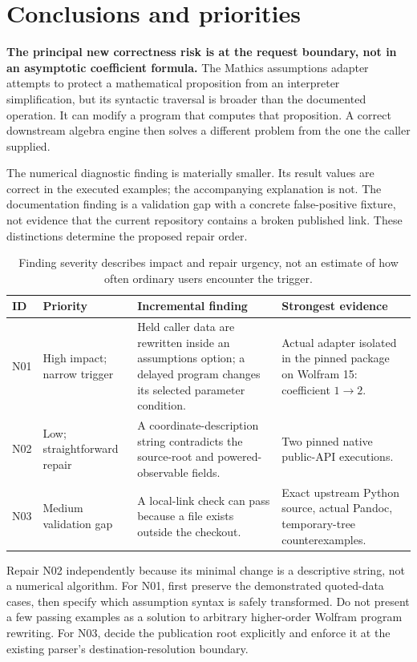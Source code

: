 \documentclass[11pt,letterpaper]{article}
\begin{document}
\section{Conclusions and priorities}

\textbf{The principal new correctness risk is at the request boundary, not in
an asymptotic coefficient formula.} The Mathics assumptions adapter attempts to
protect a mathematical proposition from an interpreter simplification, but its
syntactic traversal is broader than the documented operation. It can modify a
program that computes that proposition. A correct downstream algebra engine
then solves a different problem from the one the caller supplied.

The numerical diagnostic finding is materially smaller. Its result values are
correct in the executed examples; the accompanying explanation is not. The
documentation finding is a validation gap with a concrete false-positive
fixture, not evidence that the current repository contains a broken published
link. These distinctions determine the proposed repair order.

\begin{table}[ht]
\centering\small
\begin{tabularx}{\linewidth}{@{}l P{2.0cm} X P{3.1cm}@{}}
\toprule
ID & Priority & Incremental finding & Strongest evidence\\
\midrule
N01 & High impact; narrow trigger & Held caller data are rewritten inside an assumptions option; a delayed program changes its selected parameter condition. & Actual adapter isolated in the pinned package on Wolfram 15: coefficient $1\to2$.\\
N02 & Low; straightforward repair & A coordinate-description string contradicts the source-root and powered-observable fields. & Two pinned native public-API executions.\\
N03 & Medium validation gap & A local-link check can pass because a file exists outside the checkout. & Exact upstream Python source, actual Pandoc, temporary-tree counterexamples.\\
\bottomrule
\end{tabularx}
\caption{Finding severity describes impact and repair urgency, not an estimate of how often ordinary users encounter the trigger.}
\end{table}

Repair N02 independently because its minimal change is a descriptive string,
not a numerical algorithm. For N01, first preserve the demonstrated quoted-data
cases, then specify which assumption syntax is safely transformed. Do not
present a few passing examples as a solution to arbitrary higher-order Wolfram
program rewriting. For N03, decide the publication root explicitly and enforce
it at the existing parser's destination-resolution boundary.
\end{document}

